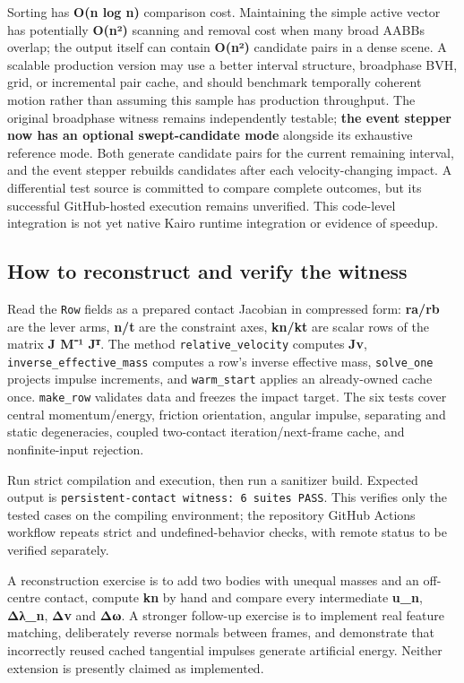 Sorting has \textbf{O(n log n)} comparison cost. Maintaining the simple active vector has potentially \textbf{O(n²)} scanning and removal cost when many broad AABBs overlap; the output itself can contain \textbf{O(n²)} candidate pairs in a dense scene. A scalable production version may use a better interval structure, broadphase BVH, grid, or incremental pair cache, and should benchmark temporally coherent motion rather than assuming this sample has production throughput. The original broadphase witness remains independently testable; \textbf{the event stepper now has an optional swept-candidate mode} alongside its exhaustive reference mode. Both generate candidate pairs for the current remaining interval, and the event stepper rebuilds candidates after each velocity-changing impact. A differential test source is committed to compare complete outcomes, but its successful GitHub-hosted execution remains unverified. This code-level integration is not yet native Kairo runtime integration or evidence of speedup.

\subsection{How to reconstruct and verify the witness}\label{appendix-c9d92e145503-how-to-reconstruct-and-verify-the-witness}

Read the \texttt{Row} fields as a prepared contact Jacobian in compressed form: \textbf{ra/rb} are the lever arms, \textbf{n/t} are the constraint axes, \textbf{kn/kt} are scalar rows of the matrix \textbf{J M⁻¹ Jᵀ}. The method \texttt{relative\_velocity} computes \textbf{Jv}, \texttt{inverse\_effective\_mass} computes a row's inverse effective mass, \texttt{solve\_one} projects impulse increments, and \texttt{warm\_start} applies an already-owned cache once. \texttt{make\_row} validates data and freezes the impact target. The six tests cover central momentum/energy, friction orientation, angular impulse, separating and static degeneracies, coupled two-contact iteration/next-frame cache, and nonfinite-input rejection.

Run strict compilation and execution, then run a sanitizer build. Expected output is \texttt{persistent-contact\ witness:\ 6\ suites\ PASS}. This verifies only the tested cases on the compiling environment; the repository GitHub Actions workflow repeats strict and undefined-behavior checks, with remote status to be verified separately.

A reconstruction exercise is to add two bodies with unequal masses and an off-centre contact, compute \textbf{kn} by hand and compare every intermediate \textbf{u\_n}, \textbf{Δλ\_n}, \textbf{Δv} and \textbf{Δω}. A stronger follow-up exercise is to implement real feature matching, deliberately reverse normals between frames, and demonstrate that incorrectly reused cached tangential impulses generate artificial energy. Neither extension is presently claimed as implemented.

